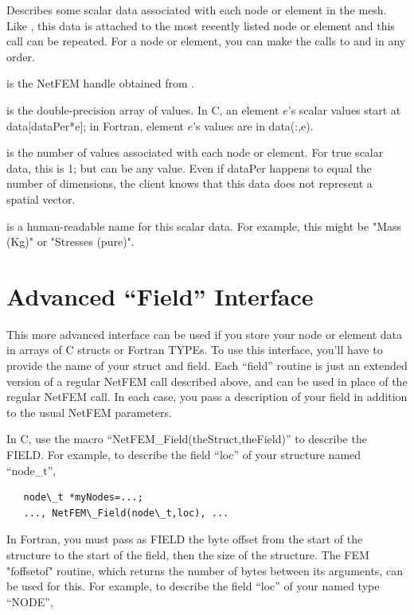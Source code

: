 \documentclass[10pt]{article}
\begin{document}
Describes some scalar data associated with each node or element
in the mesh.  Like , this data is attached 
to the most recently listed node or element and this call 
can be repeated.  For a node or element, you can make the 
calls to  and  in any order.

 is the NetFEM handle obtained from .

 is the double-precision array of values.
In C, an element $e$'s scalar values start at data[dataPer*e];
in Fortran, element $e$'s values are in data(:,e).

 is the number of values associated with each 
node or element.  For true scalar data, this is 1; but 
can be any value.  Even if dataPer happens to equal the number
of dimensions, the client knows that this data does not 
represent a spatial vector.

 is a human-readable name for this scalar data.
For example, this might be "Mass (Kg)" or "Stresses (pure)".



\section{Advanced ``Field'' Interface}
This more advanced interface can be used if you 
store your node or element data in arrays of C structs or 
Fortran TYPEs.  To use this interface, you'll have to
provide the name of your struct and field.  Each
``field'' routine is just an extended version of 
a regular NetFEM call described above, and can be 
used in place of the regular NetFEM call.
In each case, you pass a description of your field
in addition to the usual NetFEM parameters.

In C, use the macro ``NetFEM\_Field(theStruct,theField)''
to describe the FIELD.  For example, to describe
the field ``loc'' of your structure named ``node\_t'',

\begin{verbatim}
   node\_t *myNodes=...;
   ..., NetFEM\_Field(node\_t,loc), ...
\end{verbatim}


In Fortran, you must pass as FIELD the byte offset from the start 
of the structure to the start of the field,
then the size of the structure.  The FEM "foffsetof" routine,
which returns the number of bytes between its arguments,
can be used for this.  For example, to describe the field
``loc'' of your named type ``NODE'',
\end{document}

